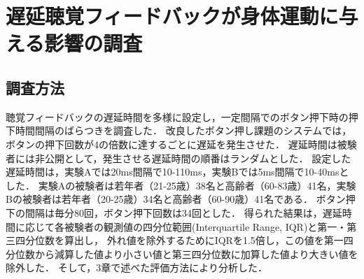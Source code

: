 \section{遅延聴覚フィードバックが身体運動に与える影響の調査}
\subsection{調査方法}
聴覚フィードバックの遅延時間を多様に設定し，一定間隔でのボタン押下時の押下時間間隔のばらつきを調査した．
改良したボタン押し課題のシステムでは，ボタンの押下回数が4の倍数に達するごとに遅延を発生させた．
遅延時間は被験者には非公開として，発生させる遅延時間の順番はランダムとした．
設定した遅延時間は，実験Aでは20ms間隔で10-110ms，実験Bでは5ms間隔で10-40msとした．
実験Aの被験者は若年者（21-25歳）38名と高齢者（60-83歳）41名，実験Bの被験者は若年者（20-25歳）34名と高齢者（60-90歳）41名である．
ボタン押下の間隔は毎分80回，ボタン押下回数は34回とした．
得られた結果は，遅延時間に応じて各被験者の観測値の四分位範囲(Interquartile Range, IQR)と第一・第三四分位数を算出し，
外れ値を除外するためにIQRを1.5倍し，この値を第一四分位数から減算した値より小さい値と第三四分位数に加算した値より大きい値を除外した．
そして，3章で述べた評価方法により分析した．
